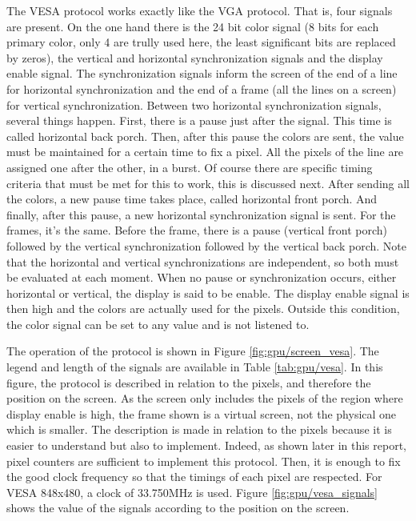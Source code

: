The VESA protocol works exactly like the VGA protocol. That is, four signals are present. On the 
one hand there is the 24 bit color signal (8 bits for each primary color, only 4 are trully used
here, the least significant bits are replaced by zeros), the vertical and 
horizontal synchronization signals and the display enable signal. The synchronization signals 
inform the screen of the end of a line for horizontal synchronization and the end of a frame (all 
the lines on a screen) for vertical synchronization. Between two horizontal synchronization 
signals, several things happen. First, there is a pause just after the signal. This time is called 
horizontal back porch. Then, after this pause the colors are sent, the value must be maintained for 
a certain time to fix a pixel. All the pixels of the line are assigned one after the other, in a 
burst. Of course there are specific timing criteria that must be met for this to work, this is 
discussed next. After sending all the colors, a new pause time takes place, called horizontal front 
porch. And finally, after this pause, a new horizontal synchronization signal is sent. For the 
frames, it's the same. Before the frame, there is a pause (vertical front porch) followed by the 
vertical synchronization followed by the vertical back porch. Note that the horizontal and vertical 
synchronizations are independent, so both must be evaluated at each moment. When no pause or 
synchronization occurs, either horizontal or vertical, the display is said to be enable. The 
display enable signal is then high and the colors are actually used for the pixels. Outside this 
condition, the color signal can be set to any value and is not listened to. 

The operation of the protocol is shown in Figure \ref{fig:gpu/screen_vesa}. The legend and length
of the signals are available in Table \ref{tab:gpu/vesa}. In this figure, 
the protocol is described in relation to the pixels, and therefore the position on the screen. As 
the screen only includes the pixels of the region where display enable is high, the frame shown is 
a virtual screen, not the physical one which is smaller. The description is made in relation to the 
pixels because 
it is easier to understand but also to implement. Indeed, as shown later in this report, pixel 
counters are sufficient to implement this protocol. Then, it is enough to fix the good clock 
frequency so that the timings of each pixel are respected. For VESA 848x480, a clock of 33.750MHz
is used. Figure \ref{fig:gpu/vesa_signals} shows the value of the signals according to the position
on the screen.

